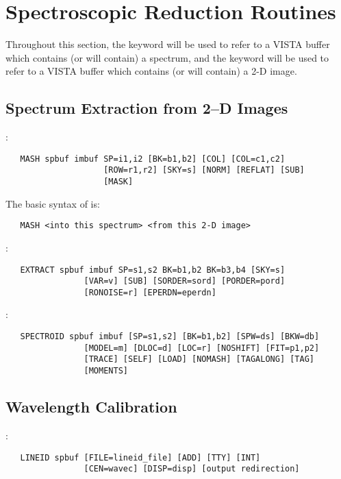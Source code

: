 \section{Spectroscopic Reduction Routines}

Throughout this section, the keyword  will be used to refer to a
VISTA buffer which contains (or will contain) a spectrum, and the keyword
 will be used to refer to a VISTA buffer which contains (or will
contain) a 2-D image.

\subsection{Spectrum Extraction from 2--D Images}

:
\begin{verbatim}
   MASH spbuf imbuf SP=i1,i2 [BK=b1,b2] [COL] [COL=c1,c2]
                    [ROW=r1,r2] [SKY=s] [NORM] [REFLAT] [SUB]
                    [MASK]
\end{verbatim}
The basic syntax of  is:
\begin{verbatim}
   MASH <into this spectrum> <from this 2-D image>
\end{verbatim}

\noindent {}:
\begin{verbatim}
   EXTRACT spbuf imbuf SP=s1,s2 BK=b1,b2 BK=b3,b4 [SKY=s]
                [VAR=v] [SUB] [SORDER=sord] [PORDER=pord]
                [RONOISE=r] [EPERDN=eperdn]
\end{verbatim}

\noindent {}:
\begin{verbatim}
   SPECTROID spbuf imbuf [SP=s1,s2] [BK=b1,b2] [SPW=ds] [BKW=db]
                [MODEL=m] [DLOC=d] [LOC=r] [NOSHIFT] [FIT=p1,p2]
                [TRACE] [SELF] [LOAD] [NOMASH] [TAGALONG] [TAG]
                [MOMENTS]
\end{verbatim}

\subsection{Wavelength Calibration}

:
\begin{verbatim}
   LINEID spbuf [FILE=lineid_file] [ADD] [TTY] [INT]
                [CEN=wavec] [DISP=disp] [output redirection]
\end{verbatim}

